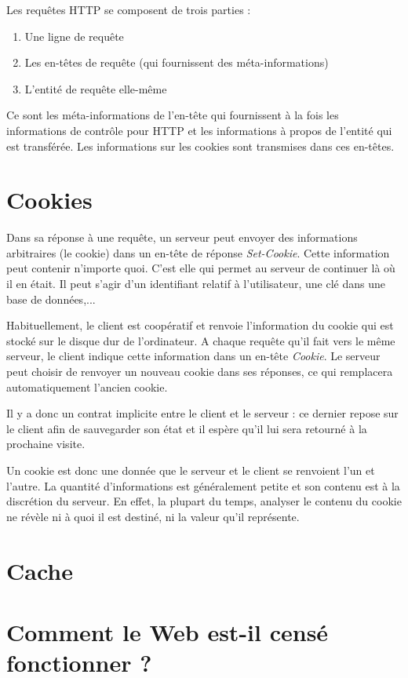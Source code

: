 \documentclass[a4paper,12pt,french]{report}
\begin{document}
Les requêtes HTTP se composent de trois parties :
\begin{enumerate}
	\item Une ligne de requête
	\item Les en-têtes de requête (qui fournissent des méta-informations)
	\item L'entité de requête elle-même
\end{enumerate}

Ce sont les méta-informations de l'en-tête qui fournissent à la fois les informations de contrôle pour HTTP et les informations à propos de l'entité qui est transférée. Les informations sur les cookies sont transmises dans ces en-têtes.
	
\section{Cookies}
Dans sa réponse à une requête, un serveur peut envoyer des informations arbitraires (le cookie) dans un en-tête de réponse \textit{Set-Cookie}. Cette information peut contenir n'importe quoi. C'est elle qui permet au serveur de continuer là où il en était. Il peut s'agir d'un identifiant relatif à l'utilisateur, une clé dans une base de données,...

Habituellement, le client est coopératif et renvoie l'information du cookie qui est stocké sur le disque dur de l'ordinateur. A chaque requête qu'il fait vers le même serveur, le client indique cette information dans un en-tête \textit{Cookie}. Le serveur peut choisir de renvoyer un nouveau cookie dans ses réponses, ce qui remplacera automatiquement l'ancien cookie.

Il y a donc un contrat implicite entre le client et le serveur : ce dernier repose sur le client afin de sauvegarder son état et il espère qu'il lui sera retourné à la prochaine visite.

Un cookie est donc une donnée que le serveur et le client se renvoient l'un et l'autre. La quantité d'informations est généralement petite et son contenu est à la discrétion du serveur. En effet, la plupart du temps, analyser le contenu du cookie ne révèle ni à quoi il est destiné, ni la valeur qu'il représente.

	\section{Cache}
		
	\section{Comment le Web est-il censé fonctionner ?}
		
\end{document}
